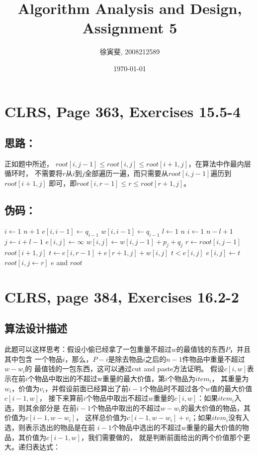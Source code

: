 \documentclass{article}
\begin{document}
\begin{CJK}{UTF8}{gbsn}
\title{Algorithm Analysis and Design, Assignment 5}
\author{徐寅斐, 2008212589}
\date{\today}
\maketitle

\section{CLRS, Page 363, Exercises 15.5-4}

\subsection*{思路：}

正如题中所述， $root[i, j - 1] \leq root[i, j] \leq root[i + 1, j]$，在算法中作最内层循环时，
不需要将$r$从$i$到$j$全部遍历一遍，而只需要从$root[i, j - 1]$遍历到$root[i + 1, j]$
即可，即$root[i,r-1]\leq r \leq root[r+1,j]$。
\subsection*{伪码：}

\begin{codebox}
\li	\For $i \gets 1$ \To $n+1$
\li		\Do $e[i,i-1] \gets q_{i-1}$
\li			$w[i,i-1] \gets q_{i-1}$
		\End
\li	\For $l \gets 1$ \To $n$
\li		\Do \For $i \gets 1$ \To $n-l+1$
\li			\Do $j \gets i+l-1$
\li				$e[i,j] \gets \infty$
\li 			$w[i,j] \gets w[i,j-1]+p_j + q_j$
\li				\For $r \gets root[i, j-1]$ \To $root[i+1,j]$
\li 				\Do $t \gets e[i,r-1] + e[r+1, j] + w[i,j]$
\li						\If $t < e[i,j]$
\li							\Then $e[i,j] \gets t$
\li									$root[i,j \gets r]$
							\End
					\End
			\End
		\End
\li \Return $e$ and $root$
\end{codebox}

\section{CLRS, page 384, Exercises 16.2-2}
\subsection{算法设计描述}
此题可以这样思考：假设小偷已经拿了一包重量不超过$w$的最值钱的东西$P$，并且其中包含
一个物品$i$，那么，$P - i$是除去物品$i$之后的$n-1$件物品中重量不超过$w-w_i$的
最值钱的一包东西，这可以通过cut and paste方法证明。
假设$c[i,w]$表示在前$i$个物品中取出的不超过w重量的最大价值，第$i$个物品为$item_i$，
其重量为$w_i$，价值为$v_i$，并假设前面已经算出了前$i-1$个物品时不超过各个$w$值的最大价值$c[i-1,w]$，
接下来算前$i$个物品中取出不超过$w$重量的$c[i,w]$：如果$item_i$入选，则其余部分是
在前$i-1$个物品中取出的不超过$w-w_i$的最大价值的物品，其价值为$c[i-1,w-w_i]$，
这样总价值为$c[i-1,w-w_i]+v_i$；如果$item_i$没有入选，则表示选出的物品是在前
$i-1$个物品中选出的不超过$w$重量的最大价值的物品，其价值为$c[i-1,w]$，我们需要做的，
就是判断前面给出的两个价值那个更大。递归表达式：\newline


\end{CJK}
\end{document}
